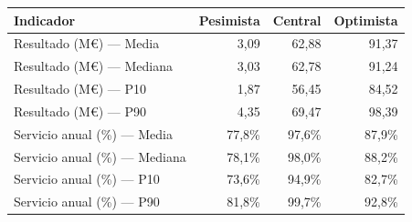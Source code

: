 \begin{tabular}{lrrr}
\toprule
Indicador & Pesimista & Central & Optimista \\
\midrule
Resultado (M€) — Media & 3,09 & 62,88 & 91,37 \\
Resultado (M€) — Mediana & 3,03 & 62,78 & 91,24 \\
Resultado (M€) — P10 & 1,87 & 56,45 & 84,52 \\
Resultado (M€) — P90 & 4,35 & 69,47 & 98,39 \\
Servicio anual (\%) — Media & 77,8\% & 97,6\% & 87,9\% \\
Servicio anual (\%) — Mediana & 78,1\% & 98,0\% & 88,2\% \\
Servicio anual (\%) — P10 & 73,6\% & 94,9\% & 82,7\% \\
Servicio anual (\%) — P90 & 81,8\% & 99,7\% & 92,8\% \\
\bottomrule
\end{tabular}
